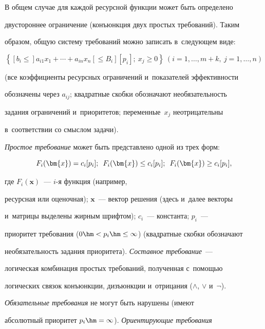   


  В общем случае для каждой ресурсной функ\-ции может быть определено 


двустороннее ограничение (конъюнкция двух простых требований). Таким 


образом, общую сис\-те\-му требований мож\-но записать в~сле\-ду\-ющем виде:


  $$


\left\{ \left[b_i\leq \right] a_{i1}x_1 +\cdots + a_{in}x_n \left[\leq B_i\right]\left[p_i\right];\ x_j 


\geq0\right\}\ (i = 1,\ldots , m + k,\ j=1,\ldots , n)


$$


(все коэффициенты ресурсных ограничений и~показателей эф\-фек\-тив\-ности 


обозначены через $a_{ij}$; квадратные скоб\-ки обозначают не\-обя\-за\-тель\-ность 


задания ограничений и~приоритетов; переменные~$x_j$ неотрицательны 


в~соответствии со смыс\-лом задачи).


  


  \textit{Простое требование} может быть пред\-став\-ле\-но одной из трех форм: 


  $$


  F_i(\bm{x})=c_i[p_i];\enskip F_i(\bm{x}) \leq c_i[p_i];\enskip 


F_i(\bm{x}) \geq c_i[p_i],


$$


 где $F_i(\bm{x})$~--- $i$-я функция (например, 


ресурсная или оценочная); $\bm{x}$~--- вектор решения (здесь и~далее векторы 


и~мат\-ри\-цы выделены жир\-ным шриф\-том); $c_i$~--- константа; $p_i$~--- 


приоритет требования ($0\hm<p_i \hm\leq \infty$) (квадратные скобки обозначают 


необязательность задания приоритета). \textit{Составное требование}~--- 


логическая комбинация простых требований, полученная с~помощью 


логических связок конъюнкции, дизъюнкции и~отрицания ($\wedge$, $\vee$ и~$\neg$). 


\textit{Обязательные требования} не могут быть нарушены (имеют 


абсолютный приоритет $p_i\hm=\infty$). \textit{Ориентирующие требования} 


